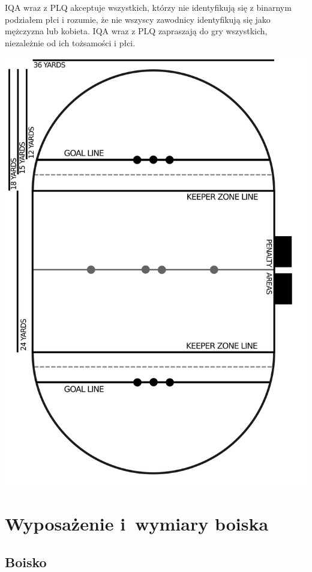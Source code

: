 \documentclass[12pt,a4paper]{article}
\begin{document}
IQA wraz z PLQ akceptuje wszystkich, którzy nie identyfikują się z binarnym podziałem płci i rozumie, że nie wszyscy zawodnicy identyfikują się jako mężczyzna lub kobieta. IQA wraz z PLQ zapraszają do gry wszystkich, niezależnie od ich tożsamości i płci.

\thispagestyle{empty}
\includegraphics[width=0.8\paperwidth]{quidditch_pitch}
\restoregeometry

\pagebreak
\section{Wyposażenie i~wymiary boiska}

\subsection{Boisko}
\end{document}
